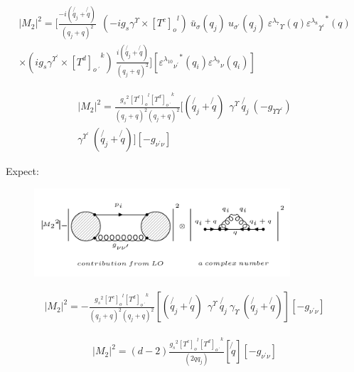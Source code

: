 \begin{equation}
\begin{split}
|M_2|^2=[\frac{-i(\not{q_j} + \not{q})}{(q_j + q)^2} \:
 \:  (-ig_s \gamma^{\Upsilon}\times {[T^c]_o}^l) \: {\bar{u}}_{\sigma}(q_j)\:u_{{\sigma}^{\prime}}(q_j) \: {\varepsilon^{\lambda_7}}_{\Upsilon} (q) {{\varepsilon^{\lambda_8}}_{{\Upsilon}^{\prime}}}^* (q) \\
\times (ig_s \gamma^{{\Upsilon}^{\prime}}\times {[T^d]_{o\:^{\prime}}}^k) \: \frac{i(\not{q_j} + \not{q})}{(q_j + q)^2} ]
[{{\varepsilon^{\lambda_{10}}}_{{\nu}^{\prime}}}^* (q_i) {\varepsilon^{\lambda_9}}_{\nu} (q_i)]
\end{split}
\end{equation}

\begin{equation}
\begin{split}
|M_2|^2=\frac{{g_s}^2 {[T^c]_o}^l {[T^d]_{o\:^{\prime}}}^k}{(q_j + q)^2 (q_j + q)^2}
[(\not{q_j} + \not{q}) \:
 \:  \gamma^{\Upsilon} \: \not{q_j} \: (-g_{{\Upsilon}{{\Upsilon}^{\prime}}}) \\
\gamma^{{\Upsilon}^{\prime}} \: (\not{q_j} + \not{q})]
[-g_{{\nu}^{\prime}{\nu}}]
\end{split}
\end{equation}

Expect:
\begin{figure}[h!]
\centering
\includegraphics[width=0.85\textwidth]{images/expectationqg-g.png}
\end{figure}

\begin{equation}
\begin{split}
|M_2|^2=-\frac{{g_s}^2 {[T^c]_o}^l {[T^d]_{o\:^{\prime}}}^k}{(q_j + q)^2 (q_j + q)^2}
[(\not{q_j} + \not{q}) \:
 \:  \gamma^{\Upsilon} \: \not{q_j} \: 
{\gamma}_{\Upsilon} \: (\not{q_j} + \not{q})]
[-g_{{\nu}^{\prime}{\nu}}]
\end{split}
\end{equation}

\begin{equation}
\begin{split}
|M_2|^2=(d-2)\frac{{g_s}^2 {[T^c]_o}^l {[T^d]_{o\:^{\prime}}}^k}{(2qq_j)}
[\not{q}]
[-g_{{\nu}^{\prime}{\nu}}]
\end{split}
\end{equation}

